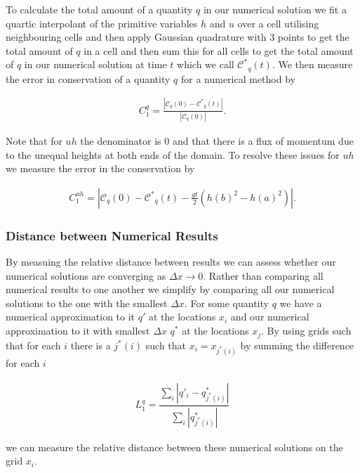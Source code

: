 \documentclass[times]{elsarticle}
\begin{document}
To calculate the total amount of a quantity $q$ in our numerical solution we fit a quartic interpolant of the primitive variables $h$ and $u$ over a cell utilising neighbouring cells and then apply Gaussian quadrature with 3 points to get the total amount of $q$ in a cell and then sum this for all cells to get the total amount of $q$ in our numerical solution at time $t$ which we call $\mathcal{C^*}_{q}(t)$. We then measure the error in conservation of a quantity $q$ for a numerical method by
\begin{linenomath*}
		\begin{gather}
		C_1^q = \frac{\left| \mathcal{C}_{q}(0) - \mathcal{C^*}_{q}(t) \right| }{\left|\mathcal{C}_{q}(0)\right|}.
		\end{gather}
\end{linenomath*}
Note that for $uh$ the denominator is $0$ and that there is a flux of momentum due to the unequal heights at both ends of the domain. To resolve these issues for $uh$ we measure the error in the conservation by
\begin{linenomath*}
	\begin{gather}
	C_1^{uh} = \left| \mathcal{C}_{q}(0) - \mathcal{C^*}_{q}(t) - \frac{gt}{2}\left(h(b)^2 - h(a)^2\right)\right|  .
	\label{eq:C1def}
	\end{gather}
\end{linenomath*}
\subsubsection{Distance between Numerical Results}
By measuing the relative distance between results we can assess whether our numerical solutions are converging as $\Delta x  \rightarrow 0$. Rather than comparing all numerical results to one another we simplify by comparing all our numerical solutions to the one with the smallest $\Delta x$. For some quantity $q$ we have a numerical approximation to it $q'$ at the locations $x_i$ and our numerical approximation to it with smallest $\Delta x$ $q^*$ at the locations $x_j$. By using grids such that for each $i$ there is a $j^*(i)$ such that $x_i = x_{j^*(i)}$ by summing the difference for each $i$
\begin{linenomath*}
	\begin{gather}
	L_1^{q} = \dfrac{\sum_{i} \left| q'_i  - q^*_{j^*(i)}\right|}{\sum_{i} \left| q^*_{j^*(i)}\right|}
	\label{eq:L1def}
	\end{gather}
\end{linenomath*}
we can measure the relative distance between these numerical solutions on the grid $x_i$.
\end{document}
